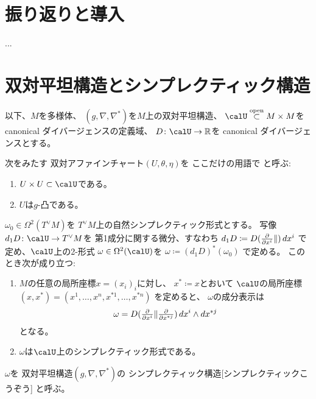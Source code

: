 \documentclass[report]{jlreq}
\begin{document}
%

%
\section*{振り返りと導入}

...

%
\section{双対平坦構造とシンプレクティック構造}

以下、$M$を多様体、
$(g, \nabla, \nabla^*)$を$M$上の双対平坦構造、
$\calU \opensubset M \times M$を canonical ダイバージェンスの定義域、
$D \colon \calU \to \R$を canonical ダイバージェンスとする。

\begin{definition}[良いチャート]
    次をみたす
    双対アファインチャート$(U, \theta, \eta)$を
    ここだけの用語で
    と呼ぶ:
    \begin{enumerate}
        \item $U \times U \subset \calU$である。
        \item $U$は$g$-凸である。
    \end{enumerate}
\end{definition}

\begin{propdef}[双対平坦構造のシンプレクティック構造]
    $\omega_0 \in \Omega^2(T^\vee M)$を
    $T^\vee M$上の自然シンプレクティック形式とする。
    写像$d_1 D \colon \calU \to T^\vee M$を
    第1成分に関する微分、すなわち
    $d_1 D \coloneqq D(\tdeldel{x^i} \|) \, dx^i$
    で定め、$\calU$上の2-形式
    $\omega \in \Omega^2(\calU)$を
    $\omega \coloneqq (d_1 D)^* (\omega_0)$
    で定める。
    このとき次が成り立つ:
    \begin{enumerate}
        \item $M$の任意の局所座標$x = (x_i)_i$に対し、
            $x^* \coloneqq x$とおいて
            $\calU$の局所座標$(x, x^*) = (x^1, \dots, x^n, x^{*1}, \dots, x^{*n})$
            を定めると、
            $\omega$の成分表示は
            \begin{equation}
                \omega
                    =
                        D(\tdeldel{x^i} \| \tdeldel{x^{*j}}) \,
                        dx^i \wedge dx^{*j}
            \end{equation}
            となる。
        \item $\omega$は$\calU$上のシンプレクティック形式である。
    \end{enumerate}
    $\omega$を
    双対平坦構造$(g, \nabla, \nabla^*)$の
        {シンプレクティック構造}[シンプレクティックこうぞう]
    と呼ぶ。
\end{propdef}
\end{document}
